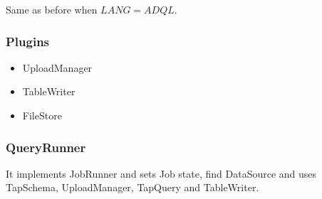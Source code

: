 Same as before when $LANG=ADQL$.

\subsubsection{Plugins}

\begin{itemize}
\item UploadManager
\item TableWriter
\item FileStore
\end{itemize}


\subsubsection{QueryRunner}

It implements JobRunner and sets Job state, find DataSource and uses TapSchema, UploadManager, TapQuery and TableWriter.

